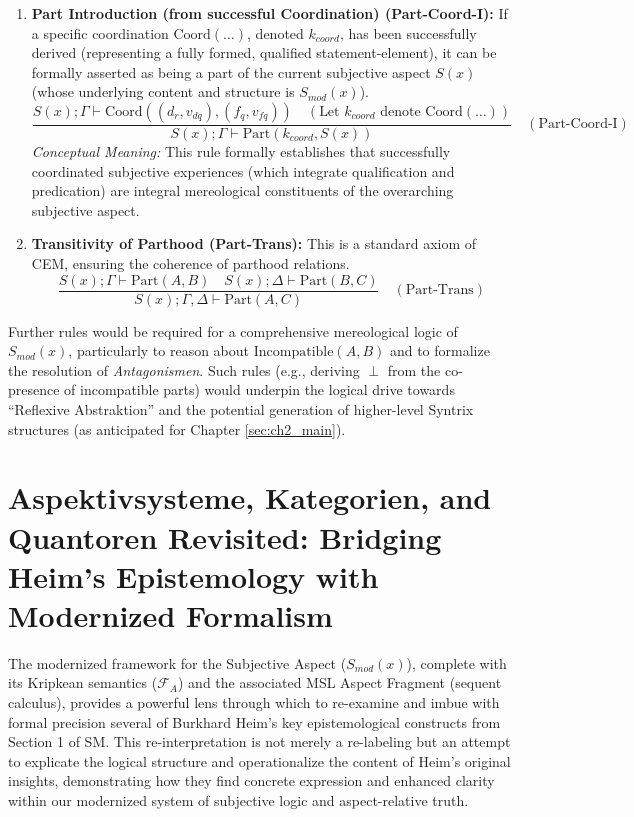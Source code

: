 \documentclass[
    12pt,              %
    a4paper,           %
    headings=normal,   %
    twoside=true,      %
    BCOR=8mm,          %
]{scrbook}
\newcommand{\q}[1]{\enquote{#1}}
\begin{document}
\begin{enumerate}[label=(\alph*)]
    \item  \textbf{Part Introduction (from successful Coordination) (Part-Coord-I):}
    If a specific coordination \(\text{Coord}(\dots)\), denoted \(k_{coord}\), has been successfully derived (representing a fully formed, qualified statement-element), it can be formally asserted as being a part of the current subjective aspect \(S(x)\) (whose underlying content and structure is \(S_{mod}(x)\)).
    \[ \frac{S(x); \Gamma \vdash \text{Coord}((d_r,v_{dq}), (f_q,v_{fq})) \quad (\text{Let } k_{coord} \text{ denote } \text{Coord}(\dots))}{S(x); \Gamma \vdash \text{Part}(k_{coord}, S(x))} \quad (\text{Part-Coord-I}) \]
    \textit{Conceptual Meaning:} This rule formally establishes that successfully coordinated subjective experiences (which integrate qualification and predication) are integral mereological constituents of the overarching subjective aspect.

    \item  \textbf{Transitivity of Parthood (Part-Trans):}
    This is a standard axiom of CEM, ensuring the coherence of parthood relations.
    \[ \frac{S(x); \Gamma \vdash \text{Part}(A,B) \quad S(x); \Delta \vdash \text{Part}(B,C)}{S(x); \Gamma, \Delta \vdash \text{Part}(A,C)} \quad (\text{Part-Trans}) \]
\end{enumerate}
Further rules would be required for a comprehensive mereological logic of \(S_{mod}(x)\), particularly to reason about \(\text{Incompatible}(A,B)\) and to formalize the resolution of \textit{Antagonismen}. Such rules (e.g., deriving \(\perp\) from the co-presence of incompatible parts) would underpin the logical drive towards \q{Reflexive Abstraktion} and the potential generation of higher-level Syntrix structures (as anticipated for Chapter \ref{sec:ch2_main}).

\section{Aspektivsysteme, Kategorien, and Quantoren Revisited: Bridging Heim's Epistemology with Modernized Formalism}
\label{sec:ch1_revisiting_heim_concepts} 

The modernized framework for the Subjective Aspect (\(S_{mod}(x)\)), complete with its Kripkean semantics (\(\mathcal{F}_A\)) and the associated MSL Aspect Fragment (sequent calculus), provides a powerful lens through which to re-examine and imbue with formal precision several of Burkhard Heim's key epistemological constructs from Section 1 of SM. This re-interpretation is not merely a re-labeling but an attempt to explicate the logical structure and operationalize the content of Heim's original insights, demonstrating how they find concrete expression and enhanced clarity within our modernized system of subjective logic and aspect-relative truth.
\end{document}
